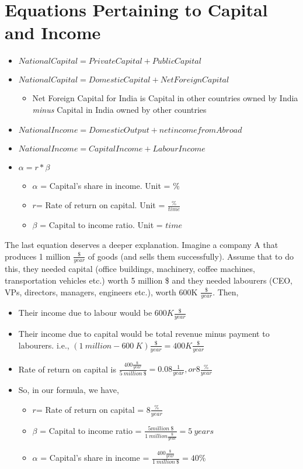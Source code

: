 \section{Equations Pertaining to Capital and Income}
\begin{itemize}
	\item $ National Capital = Private Capital + Public Capital $
	\item $ National Capital = Domestic Capital + Net Foreign Capital $
	\begin{itemize}
		\item Net Foreign Capital for India is Capital in other countries owned by India \emph{minus} Capital in India owned by other countries 
	\end{itemize}
	\item $ National Income = Domestic Output + net income from Abroad $
	\item $ National Income = Capital Income + Labour Income $
	\item $ \alpha = r*\beta $
	\begin{itemize}
		\item $ \alpha $ = Capital's share in income. Unit = $ \% $
		\item $ r $= Rate of return on capital. Unit = $ \frac{\%}{time} $
		\item $ \beta $ = Capital to income ratio. Unit = $ time $
	\end{itemize}
\end{itemize}		

The last equation deserves a deeper explanation. Imagine a company A that produces 1 million $ \frac{\$}{year} $ of goods (and sells them successfully). Assume that to do this, they needed capital (office buildings, machinery, coffee machines, transportation vehicles etc.) worth 5 million \$ and they needed labourers (CEO, VPs, directors, managers, engineers etc.), worth 600K $ \frac{\$}{year} $. Then,
\begin{itemize}
	\item Their income due to labour would be $ 600K \frac{\$}{year} $
	\item Their income due to capital would be total revenue minus payment to labourers. i.e.,  $  (1\ million - 600\ K)  \frac{\$}{year} = 400 K \frac{\$}{year} $
	\item Rate of return on capital is $ \frac{400 \frac{\$}{year}}{5\ million\ \$} = 0.08 \frac{1}{year}, or 8 \frac{\%}{year} $
	\item So, in our formula, we have,
	\begin{itemize} 
		\item $ r $= Rate of return on capital = $ 8 \frac{\%}{year} $ 
		\item $ \beta $ = Capital to income ratio = $ \frac{5 million\ \$}{1\ million \frac{\$}{year}} = 5\ years $
		\item $ \alpha $ = Capital's share in income = $ \frac{400 \frac{\$}{year}}{1\ million\ \$} = 40\% $
	\end{itemize}
\end{itemize}			

